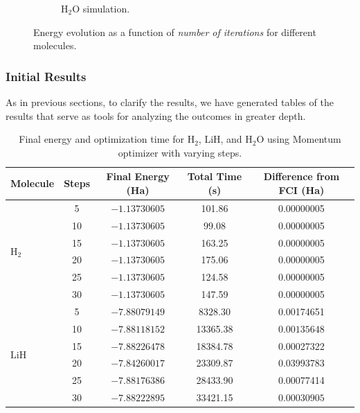 \begin{figure}[H]
\begin{subfigure}{0.45\textwidth}
    \caption{H$_2$O simulation.}
    \label{fig:num_iterations_h2o}
  \end{subfigure}
  \caption{Energy evolution as a function of \textit{number of iterations} for different molecules.}
  \label{fig:num_iterations_results}
\end{figure}

\subsubsection{Initial Results}

As in previous sections, to clarify the results, we have generated tables of the results that serve as tools for analyzing the outcomes in greater depth.

\begin{table}[H]
  \centering
  \caption{Final energy and optimization time for \(\mathrm{H_2}\), \(\mathrm{LiH}\), and \(\mathrm{H_2O}\) using Momentum optimizer with varying steps.}
  \begin{scriptsize}
  \begin{tabular}{lcccc}
  \toprule
  \textbf{Molecule} & \textbf{Steps} & \textbf{Final Energy (Ha)} & \textbf{Total Time (s)} & \textbf{Difference from FCI (Ha)} \\
  \midrule
  \multirow{6}{*}{\(\mathrm{H_2}\)} 
  & 5  & \(\mathbf{-1.13730605}\) & 101.86 & 0.00000005 \\
  & 10 & \(\mathbf{-1.13730605}\) & \(\mathbf{99.08}\) & 0.00000005 \\
  & 15 & \(\mathbf{-1.13730605}\) & 163.25 & 0.00000005 \\
  & 20 & \(\mathbf{-1.13730605}\) & 175.06 & 0.00000005 \\
  & 25 & \(\mathbf{-1.13730605}\) & 124.58 & 0.00000005 \\
  & 30 & \(\mathbf{-1.13730605}\) & 147.59 & 0.00000005 \\
  \midrule
  \multirow{6}{*}{\(\mathrm{LiH}\)} 
  & 5  & \(-7.88079149\) & \(\mathbf{8328.30}\) & 0.00174651 \\
  & 10 & \(-7.88118152\) & 13365.38 & \(\mathbf{0.00135648}\) \\
  & 15 & \(-7.88226478\) & 18384.78 & 0.00027322 \\
  & 20 & \(-7.84260017\) & 23309.87 & 0.03993783 \\
  & 25 & \(-7.88176386\) & 28433.90 & 0.00077414 \\
  & 30 & \(\mathbf{-7.88222895}\) & 33421.15 & \(\mathbf{0.00030905}\) \\

\end{tabular}
\end{scriptsize}
\end{table}

